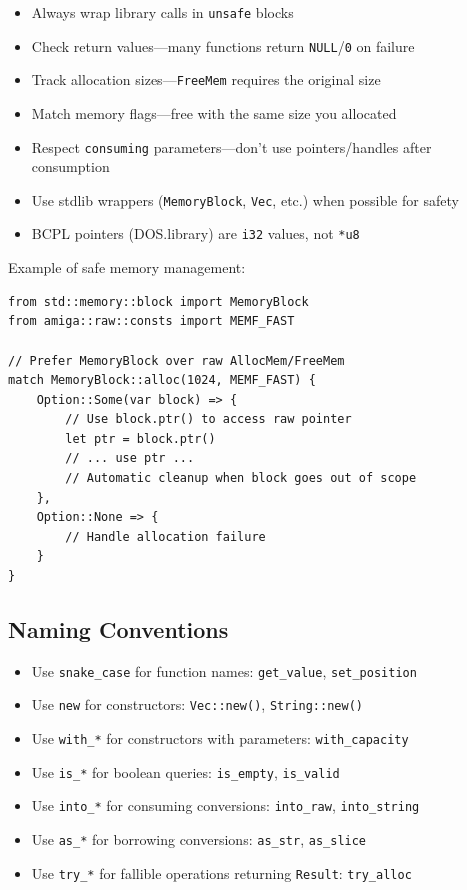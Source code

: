 \begin{itemize}
    \item Always wrap library calls in \texttt{unsafe} blocks
    \item Check return values---many functions return \texttt{NULL}/\texttt{0} on failure
    \item Track allocation sizes---\texttt{FreeMem} requires the original size
    \item Match memory flags---free with the same size you allocated
    \item Respect \texttt{consuming} parameters---don't use pointers/handles after consumption
    \item Use stdlib wrappers (\texttt{MemoryBlock}, \texttt{Vec}, etc.) when possible for safety
    \item BCPL pointers (DOS.library) are \texttt{i32} values, not \texttt{*u8}
\end{itemize}

Example of safe memory management:

\begin{lstlisting}
from std::memory::block import MemoryBlock
from amiga::raw::consts import MEMF_FAST

// Prefer MemoryBlock over raw AllocMem/FreeMem
match MemoryBlock::alloc(1024, MEMF_FAST) {
    Option::Some(var block) => {
        // Use block.ptr() to access raw pointer
        let ptr = block.ptr()
        // ... use ptr ...
        // Automatic cleanup when block goes out of scope
    },
    Option::None => {
        // Handle allocation failure
    }
}
\end{lstlisting}

\subsection{Naming Conventions}
\label{subsec:naming-conventions}

\begin{itemize}
    \item Use \texttt{snake\_case} for function names: \texttt{get\_value}, \texttt{set\_position}
    \item Use \texttt{new} for constructors: \texttt{Vec::new()}, \texttt{String::new()}
    \item Use \texttt{with\_*} for constructors with parameters: \texttt{with\_capacity}
    \item Use \texttt{is\_*} for boolean queries: \texttt{is\_empty}, \texttt{is\_valid}
    \item Use \texttt{into\_*} for consuming conversions: \texttt{into\_raw}, \texttt{into\_string}
    \item Use \texttt{as\_*} for borrowing conversions: \texttt{as\_str}, \texttt{as\_slice}
    \item Use \texttt{try\_*} for fallible operations returning \texttt{Result}: \texttt{try\_alloc}
\end{itemize}

